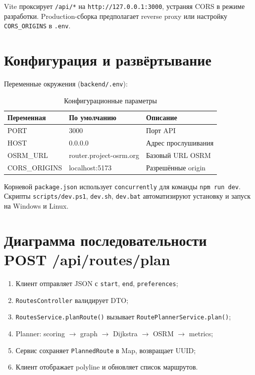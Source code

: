 Vite проксирует \texttt{/api/*} на \texttt{http://127.0.0.1:3000}, устраняя CORS
в режиме разработки. Production-сборка предполагает reverse proxy или настройку
\texttt{CORS\_ORIGINS} в \texttt{.env}.

\section{Конфигурация и развёртывание}

Переменные окружения (\texttt{backend/.env}):

\begin{table}[H]
\centering
\caption{Конфигурационные параметры}
\label{tab:env}
\begin{tabular}{@{}llp{6.5cm}@{}}
\toprule
\textbf{Переменная} & \textbf{По умолчанию} & \textbf{Описание} \\
\midrule
PORT & 3000 & Порт API \\
HOST & 0.0.0.0 & Адрес прослушивания \\
OSRM\_URL & router.project-osrm.org & Базовый URL OSRM \\
CORS\_ORIGINS & localhost:5173 & Разрешённые origin \\
\bottomrule
\end{tabular}
\end{table}

Корневой \texttt{package.json} использует \texttt{concurrently} для команды
\texttt{npm run dev}. Скрипты \texttt{scripts/dev.ps1}, \texttt{dev.sh}, \texttt{dev.bat}
автоматизируют установку и запуск на Windows и Linux.

\section{Диаграмма последовательности POST /api/routes/plan}

\begin{enumerate}
  \item Клиент отправляет JSON с \texttt{start}, \texttt{end}, \texttt{preferences};
  \item \texttt{RoutesController} валидирует DTO;
  \item \texttt{RoutesService.planRoute()} вызывает \texttt{RoutePlannerService.plan()};
  \item Planner: scoring $\to$ graph $\to$ Dijkstra $\to$ OSRM $\to$ metrics;
  \item Сервис сохраняет \texttt{PlannedRoute} в Map, возвращает UUID;
  \item Клиент отображает polyline и обновляет список маршрутов.
\end{enumerate}

